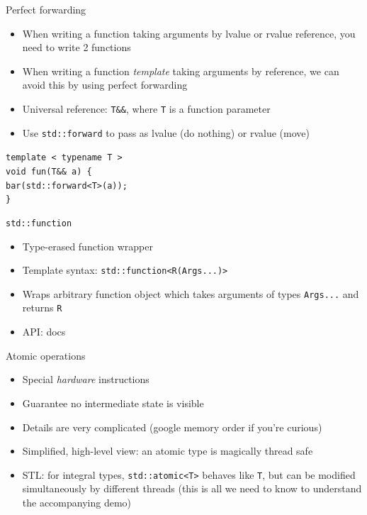 \documentclass{beamer}
\begin{document}
\begin{frame}{Perfect forwarding}
\begin{itemize}
\item When writing a function taking arguments by lvalue or rvalue reference, you need to write 2 functions
\item When writing a function \textit{template} taking arguments by reference, we can avoid this by using perfect forwarding
\item Universal reference: \texttt{T\&\&}, where \texttt{T} is a function parameter
\item Use \texttt{std::forward} to pass as lvalue (do nothing) or rvalue (move)
\end{itemize}
\texttt{template < typename T >}\\
\texttt{void fun(T\&\& a) \{}\\
\hspace{0.5cm}\texttt{bar(std::forward<T>(a));}\\
\texttt{\}}
\end{frame}

\begin{frame}{\texttt{std::function}}
\begin{itemize}
\item Type-erased function wrapper
\item Template syntax: \texttt{std::function<R(Args...)>}
\item Wraps arbitrary function object which takes arguments of types \texttt{Args...} and returns \texttt{R}
\item API: docs
\end{itemize}
\end{frame}

\begin{frame}{Atomic operations}
\begin{itemize}
\item Special \textit{hardware} instructions
\item Guarantee no intermediate state is visible
\item Details are very complicated (google memory order if you're curious)
\item Simplified, high-level view: an atomic type is magically thread safe
\item STL: for integral types, \texttt{std::atomic<T>} behaves like \texttt{T}, but can be modified simultaneously by different threads (this is all we need to know to understand the accompanying demo)
\end{itemize}
\end{frame}
\end{document}

